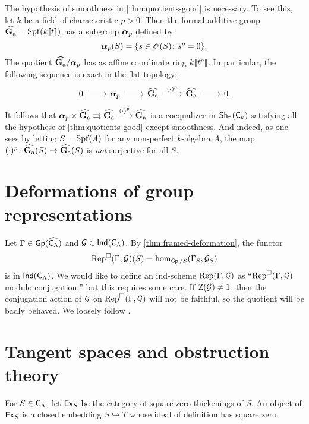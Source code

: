 \documentclass[phd,cornellheadings,draft]{cornell}
\begin{document}
\begin{example}
The hypothesis of smoothness in \ref{thm:quotients-good} is necessary. To see 
this, let $k$ be a field of characteristic $p>0$. Then the formal additive 
group $\widehat{\mathbf{G}_\mathrm{a}}=\operatorname{Spf}(k\llbracket t \rrbracket)$ has a subgroup ${\bm\alpha}_p$ defined by 
\[
  {\bm\alpha}_p(S) = \{s\in \mathscr{O}(S)\colon s^p=0\} .
\]
The quotient $\widehat{\mathbf{G}_\mathrm{a}}/{\bm\alpha}_p$ has as affine coordinate ring 
$k\llbracket t^p \rrbracket$. In particular, the following sequence is exact in the flat 
topology:
\[
\begin{tikzcd}
	0 \ar[r]
		& \balpha_p \ar[r]
		& \widehat\Ga \ar[r, "(\cdot)^p"]
		& \widehat\Ga \ar[r]
		& 0 .
\end{tikzcd}
\]
It follows that 
${\bm\alpha}_p\times \widehat{\mathbf{G}_\mathrm{a}}\rightrightarrows\widehat{\mathbf{G}_\mathrm{a}}\xrightarrow{(\cdot)^p} \widehat{\mathbf{G}_\mathrm{a}}$
is a coequalizer in $\operatorname{\mathsf{Sh}}_{\mathrm{fl}}(\mathsf{C}_k)$ satisfying all the hypothese 
of \ref{thm:quotients-good} except smoothness. And indeed, as one sees by 
letting $S=\operatorname{Spf}(A)$ for any non-perfect $k$-algebra $A$, the map 
$(\cdot)^p\colon \widehat{\mathbf{G}_\mathrm{a}}(S)\to \widehat{\mathbf{G}_\mathrm{a}}(S)$ is \emph{not} surjective for 
all $S$. 
\end{example}





\section{Deformations of group representations}

Let $\Gamma\in \operatorname{\mathsf{Gp}}(\widehat{\mathsf{C}_\Lambda})$ and $\mathcal{G}\in \operatorname{\mathsf{Ind}}(\mathsf{C}_\Lambda)$. By 
\ref{thm:framed-deformation}, the functor 
\[
  \operatorname{Rep}^\square(\Gamma,\mathcal{G})(S) = \hom_{\operatorname{\mathsf{Gp}}/S}(\Gamma_S,\mathcal{G}_S)
\]
is in $\operatorname{\mathsf{Ind}}(\mathsf{C}_\Lambda)$. We would like to define an ind-scheme 
$\operatorname{Rep}(\Gamma,\mathcal{G})$ as ``$\operatorname{Rep}^\square(\Gamma,\mathcal{G})$ modulo conjugation,'' but 
this requires some care. If $\operatorname{Z}(\mathcal{G})\ne 1$, then the conjugation action 
of $\mathcal{G}$ on $\operatorname{Rep}^\square(\Gamma,\mathcal{G})$ will not be faithful, so the quotient 
will be badly behaved. We loosely follow \cite{tilouine-1996}. 





\section{Tangent spaces and obstruction theory}

For $S\in \mathsf{C}_\Lambda$, let $\mathsf{Ex}_S$ be the category of square-zero 
thickenings of $S$. An object of $\mathsf{Ex}_S$ is a closed embedding 
$S\hookrightarrow T$ whose ideal of definition has square zero. 





\printbibliography
\end{document}
